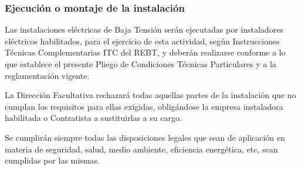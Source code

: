 \documentclass[../main.tex]{subfiles}
\begin{document}
\subsubsection{Ejecución o montaje de la instalación}
Las instalaciones eléctricas de Baja Tensión serán ejecutadas por instaladores eléctricos habilitados, para el ejercicio de esta actividad, según Instrucciones Técnicas Complementarias ITC del REBT, y deberán realizarse conforme a lo que establece el presente Pliego de Condiciones Técnicas Particulares y a la reglamentación vigente. \par
\vspace{0.5 cm}
La Dirección Facultativa rechazará todas aquellas partes de la instalación que no cumplan los requisitos para ellas exigidas, obligándose la empresa instaladora habilitada o Contratista a sustituirlas a su cargo. \par
\vspace{0.5 cm}
Se cumplirán siempre todas las disposiciones legales que sean de aplicación en materia de seguridad, salud, medio ambiente, eficiencia energética, etc, sean cumplidas por las mismas.
\end{document}
